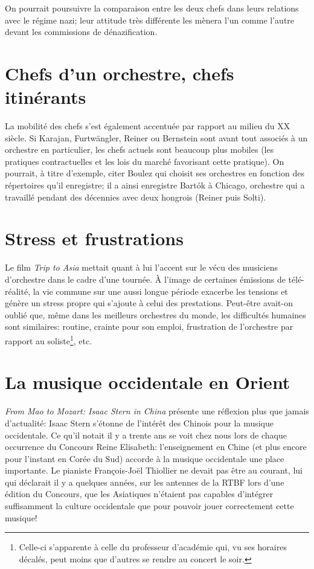 On pourrait poursuivre la comparaison entre les deux chefs dans leurs relations avec le régime nazi; leur attitude très différente les mènera l'un comme l'autre devant les commissions de dénazification.

\section*{Chefs d'un orchestre, chefs itinérants}
La mobilité des chefs s'est également accentuée par rapport au milieu du XX\ieme{} siècle. Si Karajan, Furtwängler, Reiner ou Bernstein sont avant tout associés à un orchestre en particulier, les chefs actuels sont beaucoup plus mobiles (les pratiques contractuelles et les lois du marché favorisant cette pratique). On pourrait, à titre d'exemple, citer Boulez qui choisit ses orchestres en fonction des répertoires qu'il enregistre; il a ainsi enregistre Bartók à Chicago, orchestre qui a travaillé pendant des décennies avec deux hongrois (Reiner puis Solti).


\section*{Stress et frustrations}
Le film \emph{Trip to Asia} mettait quant à lui l'accent sur le vécu des musiciens d'orchestre dans le cadre d'une tournée. À l'image de certaines émissions de télé-réalité, la vie commune sur une aussi longue période exacerbe les tensions et génère un stress propre qui s'ajoute à celui des prestations. Peut-être avait-on oublié que, même dans les meilleurs orchestres du monde, les difficultés humaines sont similaires: routine, crainte pour son emploi, frustration de l'orchestre par rapport au soliste\footnote{Celle-ci s'apparente à celle du professeur d'académie qui, vu ses horaires décalés, peut moins que d'autres se rendre au concert le soir.}, etc.

\section*{La musique occidentale en Orient}
\emph{From Mao to Mozart: Isaac Stern in China} présente une réflexion plus que jamais d'actualité: Isaac Stern s'étonne de l'intérêt des Chinois pour la musique occidentale. Ce qu'il notait il y a trente ans se voit chez nous lors de chaque occurrence du Concours Reine Elisabeth: l'enseignement en Chine (et plus encore pour l'instant en Corée du Sud) accorde à la musique occidentale une place importante. Le pianiste François-Joël Thiollier ne devait pas être au courant, lui qui déclarait il y a quelques années, sur les antennes de la RTBF lors d'une édition du Concours, que les Asiatiques n'étaient pas capables d'intégrer suffisamment la culture occidentale que pour pouvoir jouer correctement cette musique!

